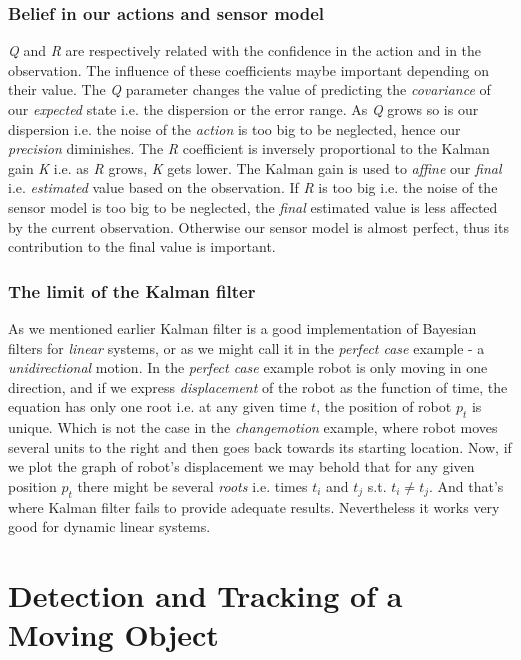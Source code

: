 \documentclass{article}
\begin{document}
\subsubsection{Belief in our actions and sensor model}
\emph{Q} and \emph{R} are respectively related with the confidence in the action and in the observation. The influence of these coefficients maybe important depending on their value. The \textit{Q} parameter changes the value of predicting the \textit{covariance} of our \textit{expected} state i.e. the dispersion or the error range. As \textit{Q} grows so is our dispersion i.e. the noise of the \textit{action} is too big to be neglected, hence our \textit{precision} diminishes. The \textit{R} coefficient is inversely proportional to the Kalman gain \textit{K} i.e. as \textit{R} grows, \textit{K} gets lower. The Kalman gain is used to \textit{affine} our \textit{final} i.e. \textit{estimated} value based on the observation. If \textit{R} is too big i.e. the noise of the sensor model is too big to be neglected, the \textit{final} estimated value is less affected by the current observation. Otherwise our sensor model is almost perfect, thus its contribution to the final value is important.
\subsubsection{The limit of the Kalman filter}
As we mentioned earlier Kalman filter is a good implementation of Bayesian filters for \textit{linear} systems, or as we might call it in the \textit{perfect case} example - a \textit{unidirectional} motion. In the \textit{perfect case} example robot is only moving in one direction, and if we express \textit{displacement} of the robot as the function of time, the equation has only one root i.e. at any given time $t$, the position of robot $p_t$ is unique. Which is not the case in the \textit{changemotion} example, where robot moves several units to the right and then goes back towards its starting location. Now, if we plot the graph of robot's displacement we may behold that for any given position $p_t$ there might be several \textit{roots} i.e. times $t_i$ and $t_j$ s.t. $t_i \neq t_j$. And that's where Kalman filter fails to provide adequate results. Nevertheless it works very good for dynamic linear systems.

\section{Detection and Tracking of a Moving Object}
\end{document}
